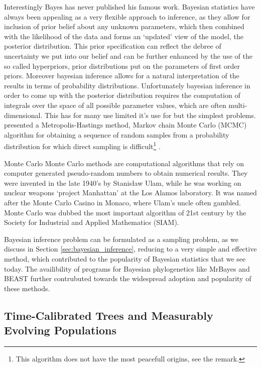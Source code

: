 Interestingly Bayes has never published his famous work.
Bayesian statistics have always been appealing as a very flexible approach to inference, as they allow for inclusion of prior belief about any unknown parameters, which then combined with the likelihood of the data and forms an `updated' view of the model, the posterior distribution.
This prior specification can reflect the debree of uncertainty we put into our belief and can be further enhanced by the use of the so called hyperpriors, prior distributions put on the parameters of first order priors.
Moreover bayesian inference allows for a natural interpretation of the results in terms of probability distributions. %
Unfortunately bayesian inference in order to come up with the posterior distribution requires the computation of integrals over the space of all possible parameter values, which are often multi-dimensional.
This has for many use limited it's use for but the simplest problems.
\cite{Metropolis1953} presented a Metropolis-Hastings method, Markov chain Monte Carlo (MCMC) algorithm for obtaining a sequence of random samples from a probability distribution for which direct sampling is difficult\footnote{This algorithm does not have the most peacefull origins, see the remark.} .

\begin{remark}{Monte Carlo}
Monte Carlo methods are computational algorithms that rely on computer generated pseudo-random numbers to obtain numerical results. 
They were invented in the late 1940's by Stanis\l{}aw Ulam, while he was working on nuclear weapons `project Manhattan'
at the Los Alamos laboratory.  
It was named after the Monte Carlo Casino in Monaco, where Ulam's uncle often gambled.
Monte Carlo was dubbed the most important algorithm of 21st century by the Society for Industrial and Applied Mathematics (SIAM).
\end{remark}

Bayesian inference problem can be formulated as a sampling problem, as we discuss in Section \ref{sec:bayesian_inference}, reducing to a very simple and effective method, which contributed to the popularity of Bayesian statistics that we see today. 
The availibility of programs for Bayesian phylogenetics like MrBayes \citep{Huelsenbeck2001} and BEAST \citep{Drummond2012} further contrubuted towards the widespread adoption and popularity of these methods.

\subsection{Time-Calibrated Trees and Measurably Evolving Populations\label{sub:clocks}}

